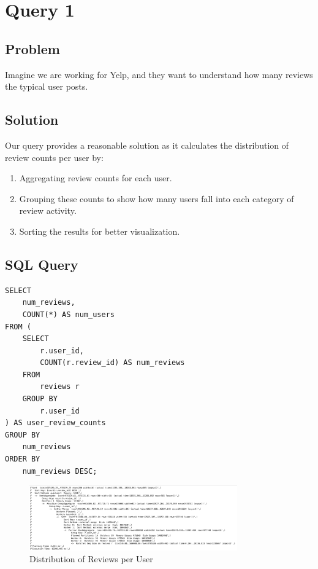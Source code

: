 \documentclass{article}
\begin{document}
\section{Query 1}

\subsection*{Problem}
Imagine we are working for Yelp, and they want to understand how many reviews the typical user posts.

\subsection*{Solution}
Our query provides a reasonable solution as it calculates the distribution of review counts per user by:
\begin{enumerate}
    \item Aggregating review counts for each user.
    \item Grouping these counts to show how many users fall into each category of review activity.
    \item Sorting the results for better visualization.
\end{enumerate}

\subsection*{SQL Query}
\begin{lstlisting}[caption={SQL Query to Analyze User Review Counts}, label={lst:user-review-counts}]
SELECT
    num_reviews,
    COUNT(*) AS num_users
FROM (
    SELECT
        r.user_id,
        COUNT(r.review_id) AS num_reviews
    FROM
        reviews r
    GROUP BY
        r.user_id
) AS user_review_counts
GROUP BY
    num_reviews
ORDER BY
    num_reviews DESC;
\end{lstlisting}


\begin{figure}[h!]
    \centering
    \includegraphics[width=0.8\textwidth]{correction.png} %
    \caption{Distribution of Reviews per User}
    \label{fig:example} %
\end{figure}
\end{document}
